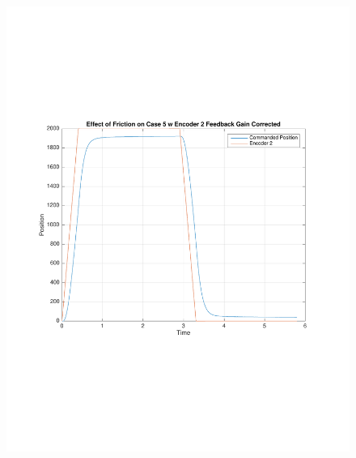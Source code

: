 \documentclass[11pt, a4paper]{article}
\begin{document}
\begin{figure}[H]
\centering
\includegraphics[width = \textwidth]{6_fric.pdf}
\end{figure}
\end{document}
